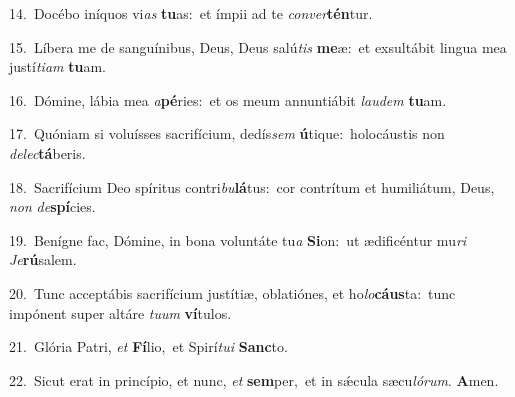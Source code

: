 {\numbfont\textcolor{\numbcolor}{14.}}~Docébo iníquos vi\textit{as} \textbf{tu}\-as:~\star et ímpii ad te \textit{con}\-\textit{ver}\textbf{tén}tur.\par
{\numbfont\textcolor{\numbcolor}{15.}}~Líbera me de sanguínibus, Deus, Deus salú\textit{tis} \textbf{me}\-æ:~\star et exsultábit lingua mea justí\-\textit{ti}\-\textit{am} \textbf{tu}\-am.\par
{\numbfont\textcolor{\numbcolor}{16.}}~Dómine, lábia mea \textit{a}\-\textbf{pé}ries:~\star et os meum annuntiábit \textit{lau}\-\textit{dem} \textbf{tu}\-am.\par
{\numbfont\textcolor{\numbcolor}{17.}}~Quóniam si voluísses sacrifícium, dedís\textit{sem} \textbf{ú}\-tique:~\star holocáustis non \textit{de}\-\textit{lec}\textbf{tá}beris.\par
{\numbfont\textcolor{\numbcolor}{18.}}~Sacrifícium Deo spíritus contri\-\textit{bu}\-\textbf{lá}tus:~\star cor contrítum et humiliátum, Deus, \textit{non} \textit{de}\-\textbf{spí}cies.\par
{\numbfont\textcolor{\numbcolor}{19.}}~Benígne fac, Dómine, in bona voluntáte tu\textit{a} \textbf{Si}\-on:~\star ut ædificéntur mu\textit{ri} \textit{Je}\-\textbf{rú}salem.\par
{\numbfont\textcolor{\numbcolor}{20.}}~Tunc acceptábis sacrifícium justítiæ, oblatiónes, et ho\-\textit{lo}\-\textbf{cáus}ta:~\star tunc impónent super altáre \textit{tu}\-\textit{um} \textbf{ví}\-tulos.\par
{\numbfont\textcolor{\numbcolor}{21.}}~Glória Patri, \textit{et} \textbf{Fí}\-lio,~\star et Spirí\-\textit{tu}\-\textit{i} \textbf{Sanc}\-to.\par
{\numbfont\textcolor{\numbcolor}{22.}}~Sicut erat in princípio, et nunc, \textit{et} \textbf{sem}\-per,~\star et in sǽcula sæcu\-\textit{ló}\-\textit{rum}. \textbf{A}\-men.\par
